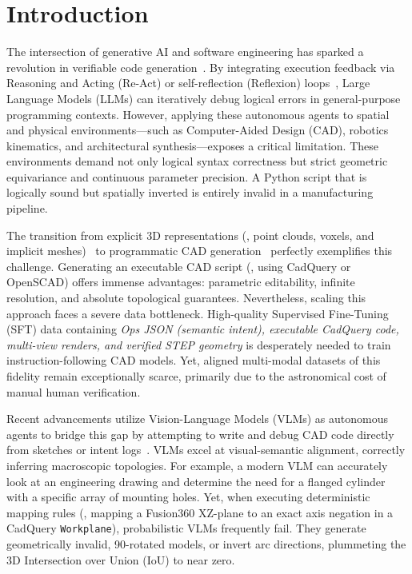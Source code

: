 \section{Introduction}
\label{sec:intro}

The intersection of generative AI and software engineering has sparked a revolution in
verifiable code generation~\cite{Schick2023,Ouyang2022}.
By integrating execution feedback via Reasoning and Acting (Re-Act) or self-reflection
(Reflexion) loops~\cite{Yao2023,Shinn2023}, Large Language Models (LLMs) can iteratively
debug logical errors in general-purpose programming contexts.
However, applying these autonomous agents to spatial and physical
environments---such as Computer-Aided Design (CAD), robotics kinematics, and
architectural synthesis---exposes a critical limitation.
These environments demand not only logical syntax correctness but strict geometric
equivariance and continuous parameter precision.
A Python script that is logically sound but spatially inverted is entirely invalid in a
manufacturing pipeline.

The transition from explicit 3D representations (\eg, point clouds, voxels, and implicit
meshes)~\cite{Nichol2022,Jun2023} to programmatic CAD
generation~\cite{Willis2021fusion,Wang2024sketch} perfectly exemplifies this challenge.
Generating an executable CAD script (\eg, using CadQuery or OpenSCAD) offers immense
advantages: parametric editability, infinite resolution, and absolute topological
guarantees.
Nevertheless, scaling this approach faces a severe data bottleneck.
High-quality Supervised Fine-Tuning (SFT) data containing \emph{Ops JSON (semantic
intent), executable CadQuery code, multi-view renders, and verified STEP geometry} is
desperately needed to train instruction-following CAD models.
Yet, aligned multi-modal datasets of this fidelity remain exceptionally scarce, primarily
due to the astronomical cost of manual human verification.

Recent advancements utilize Vision-Language Models (VLMs) as autonomous agents to bridge
this gap by attempting to write and debug CAD code directly from sketches or intent
logs~\cite{Wang2024qwen2vl}.
VLMs excel at visual-semantic alignment, correctly inferring macroscopic topologies.
For example, a modern VLM can accurately look at an engineering drawing and determine the
need for a flanged cylinder with a specific array of mounting holes.
Yet, when executing deterministic mapping rules (\eg, mapping a Fusion360 XZ-plane to an
exact axis negation in a CadQuery \texttt{Workplane}), probabilistic VLMs frequently fail.
They generate geometrically invalid, 90\textdegree-rotated models, or invert arc
directions, plummeting the 3D Intersection over Union (IoU) to near zero.

